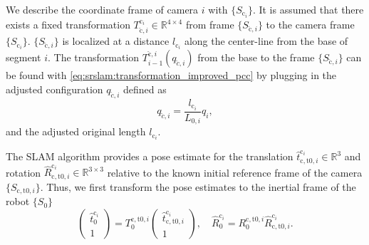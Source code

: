 We describe the coordinate frame of camera $i$ with $\{ S_{\mathrm{c}_i} \}$. It is assumed that there exists a fixed transformation $T_{\check{\mathrm{c}},i}^{\mathrm{c}_i} \in \mathbb{R}^{4 \times 4}$ from frame $\{ S_{\check{\mathrm{c}},i} \}$ to the camera frame $\{ S_{\mathrm{c}_i} \}$. 
$\{ S_{\check{\mathrm{c}},i} \}$ is localized at a distance $l_{\mathrm{c}_i}$ along the center-line from the base of segment $i$. 
The transformation $T_{i-1}^{\check{\mathrm{c}},i}(q_{\check{c},i})$ from the base to the frame $\{ S_{\check{\mathrm{c}},i} \}$ can be found with \eqref{eq:srslam:transformation_improved_pcc} by plugging in the adjusted configuration $q_{\check{c},i}$ defined as
\begin{equation}\label{eq:srslam:camera_configuration}
    q_{\check{c},i} = \frac{l_{\mathrm{c}_i}}{L_{0,i}} q_i,
\end{equation}
and the adjusted original length  $l_{\mathrm{c}_i}$.

The \gls{SLAM} algorithm provides a pose estimate for the translation $\hat{t}_{\mathrm{c},\mathrm{t}0,i}^{\mathrm{c}_i} \in \mathbb{R}^3$ and rotation $\hat{R}_{\mathrm{c},\mathrm{t}0,i}^{\mathrm{c}_i} \in \mathbb{R}^{3 \times 3}$ relative to the known initial reference frame of the camera $\{ S_{\mathrm{c},\mathrm{t}0,i} \}$. 
Thus, we first transform the pose estimates to the inertial frame of the robot $\{ S_0 \}$
\begin{equation}
    \begin{pmatrix}
        \hat{t}_{0}^{\mathrm{c}_i}\\
        1
    \end{pmatrix}
    = T_0^{\mathrm{c},\mathrm{t}0,i}
    \begin{pmatrix}
        \hat{t}_{\mathrm{c},\mathrm{t}0,i}^{\mathrm{c}_i}\\
        1
    \end{pmatrix},
    \quad
    \hat{R}_{0}^{\mathrm{c}_i} = R_0^{\mathrm{c},\mathrm{t}0,i} \hat{R}_{\mathrm{c},\mathrm{t}0,i}^{\mathrm{c}_i}.
\end{equation}

